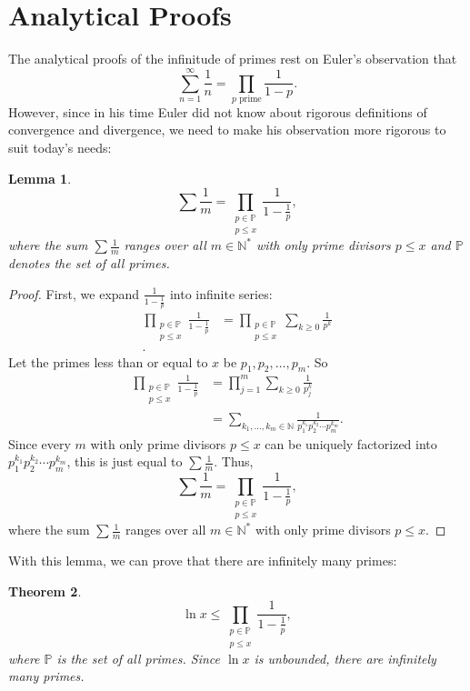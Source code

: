 \documentclass[a4paper]{article}
\newtheorem{theorem}{Theorem}[section]
\newtheorem{lemma}[theorem]{Lemma}
\theoremstyle{definition}
\theoremstyle{remark}
\begin{document}
\section{Analytical Proofs}
\label{sec:analytical}
The analytical proofs of the infinitude of primes rest on Euler's observation that 
\[
\sum^\infty_{n=1}\frac{1}{n}=\prod_{p\text{ prime}}\frac{1}{1-p}
.
\]
However, since in his time Euler did not know about rigorous definitions of convergence and divergence, we need to make his observation more rigorous to suit today's needs:
\begin{lemma}
  \[
  \sum\frac{1}{m}=\prod\limits_{\substack{p\in\mathbb{P}\\p\le x}}\frac{1}{1-\frac{1}{p}}
  ,
  \]
  where the sum $\sum\frac{1}{m}$ ranges over all $m\in\mathbb{N^*}$ with only prime divisors $p\le x$ and $\mathbb{P}$ denotes the set of all primes.
  \label{lem:EulerProduct}
\end{lemma}
\begin{proof}
  First, we expand $\frac{1}{1-\frac{1}{p}}$ into infinite series:
  \begin{align*}
    \prod\limits_{\substack{p\in\mathbb{P}\\p\le x}}\frac{1}{1-\frac{1}{p}}&=\prod\limits_{\substack{p\in\mathbb{P}\\p\le x}}\sum_{k\ge0}\frac{1}{p^k}\\
    .
  \end{align*}
  Let the primes less than or equal to $x$ be $p_1,p_2,\dots,p_m$. So
  \begin{align*}
    \prod\limits_{\substack{p\in\mathbb{P}\\p\le x}}\frac{1}{1-\frac{1}{p}}&=\prod\limits_{j=1}^m\sum_{k\ge0}\frac{1}{p_j^k}\\
    &=\sum\limits_{k_1,\dots,k_m\in\mathbb{N}}\frac{1}{p_1^{k_1}p_2^{k_2}\cdots p_m^{k_m}}
    .
  \end{align*}
  Since every $m$ with only prime divisors $p\le x$ can be uniquely factorized into $p_1^{k_1}p_2^{k_2}\cdots p_m^{k_m}$, this is just equal to $\sum\frac{1}{m}$. Thus,
  \[
  \sum\frac{1}{m}=\prod\limits_{\substack{p\in\mathbb{P}\\p\le x}}\frac{1}{1-\frac{1}{p}}
  ,
  \]
  where the sum $\sum\frac{1}{m}$ ranges over all $m\in\mathbb{N^*}$ with only prime divisors $p\le x$.
\end{proof}
With this lemma, we can prove that there are infinitely many primes:
\begin{theorem}
  \[
  \ln x\le \prod\limits_{\substack{p\in\mathbb{P}\\p\le x}}\frac{1}{1-\frac{1}{p}}
  ,
  \]
  where $\mathbb{P}$ is the set of all primes. Since $\ln x$ is unbounded, there are infinitely many primes.
  \label{thm:EulerInfinitePrimes}
\end{theorem}
\end{document}
